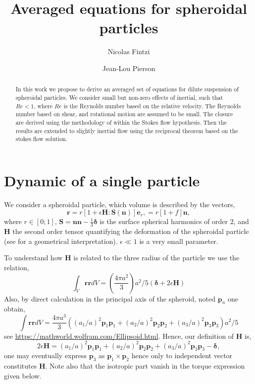 \documentclass[12pt]{My_preprint}
\title{Averaged equations for spheroidal particles  }
\author[1]{Nicolas Fintzi}
\author[1]{Jean-Lou Pierson}
\affil[1]{IFP Energies Nouvelles, Rond-point de l’changeur de Solaize, 69360 Solaize}
\begin{document}
\maketitle

\begin{abstract}
    In this work we propose to derive an averaged set of equations for dilute suspension of spheroidal particles. 
    We consider small but non-zero effects of inertial, such that $Re<1$, where $Re$ is the Reynolds number based on the relative velocity. 
    The Reynolds number based on shear, and rotational motion are assumed to be small.
    The closure are derived using the methodology of \citet{brenner1963resistance} within the Stokes flow hypothesis. 
    Then the results are extended to slightly inertial flow using the reciprocal theorem based on the stokes flow solution. 
\end{abstract}


\section{Dynamic of a single particle}

We consider a spheroidal particle, which volume is described by the vectors, 
\begin{equation}
    \textbf{r} 
    = r [1 + \epsilon \textbf{H}:\textbf{S}(\textbf{n})]\textbf{e}_r,
    = r [1 + f]\textbf{n},
\end{equation}
where $r\in [0;1]$, $\textbf{S} = \textbf{nn} - \frac{1}{3}\bm\delta$ is the surface spherical harmonics of order $2$, and \textbf{H} the second order tensor quantifying the deformation of the spheroidal particle (see \citet{nadim1996concise} for a geometrical interpretation).  
$\epsilon\ll 1$ is a very small parameter. 

To understand how $\textbf{H}$ is related to the three radius of the particle we use the relation, 
\begin{equation}
    \int_{V} \textbf{rr} dV = (\frac{4\pi a^2}{3}) a^2/5(\bm\delta+ 2\epsilon \textbf{H})
\end{equation}
Also, by direct calculation in the principal axis of the spheroid, noted $\textbf{p}_n$ one obtain, 
\begin{equation}
    \int \textbf{rr} dV =  \frac{4\pi a^3}{3} ((a_1/a)^2 \textbf{p}_1 \textbf{p}_1+ (a_2/a)^2\textbf{p}_2 \textbf{p}_2 + (a_3/a)^2\textbf{p}_3 \textbf{p}_3)a^2/5
\end{equation}
see \url{https://mathworld.wolfram.com/Ellipsoid.html}. 
Hence, our definition of \textbf{H} is, 
\begin{equation}
    2\epsilon \textbf{H}= (a_1/a)^2 \textbf{p}_1 \textbf{p}_1+ (a_2/a)^2\textbf{p}_2 \textbf{p}_2 + (a_3/a)^2\textbf{p}_3 \textbf{p}_3 - \bm\delta,
\end{equation}
one may eventually express $\textbf{p}_3$ as $\textbf{p}_1 \times \textbf{p}_2$ hence only to independent vector constitutes $\textbf{H}$. 
Note also that the isotropic part vanish in the torque expression given below. 
\end{document}
